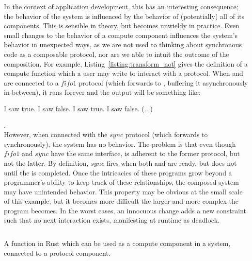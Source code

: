 In the context of application development, this has an interesting consequence; the behavior of the system is influenced by the behavior of (potentially) all of its components. This is sensible in theory, but becomes unwieldy in practice. Even small changes to the behavior of a compute component influences the system's behavior in unexpected ways, as we are not used to thinking about synchronous code as a composable protocol, nor are we able to intuit the outcome of the composition. For example, Listing~\ref{listing:transform_not} gives the definition of a compute function which a user may write to interact with a protocol. When  and  are connected to a $fifo1$ protocol (which forwards  to , buffering it asynchronously in-between), it runs forever and the output will be something like:
\begin{verb}
	I saw true. I saw false. I saw true. I saw false. (...)
\end{verb}.\\However, when connected with the $sync$ protocol (which forwards  to  synchronously), the system has no behavior. The problem is that even though $fifo1$ and $sync$ have the same interface,  is adherent to the former protocol, but not the latter. By definition, $sync$ fires when both  and  are ready, but  does not  until the  is completed. Once the intricacies of these programs grow beyond a programmer's ability to keep track of these relationships, the composed system may have unintended behavior. This property may be obvious at the small scale of this example, but it becomes more difficult the larger and more complex the program becomes. In the worst cases, an innocuous change adds a new constraint such that no next interaction exists, manifesting at runtime as deadlock. 


\begin{listing}[ht]
	\inputminted[]{rust}{transform_not.rs}
	\caption[Rust example of a compute component.]{A function in Rust which can be used as a compute component in a system, connected to a protocol component.}
	\label{listing:transform_not}
\end{listing}


